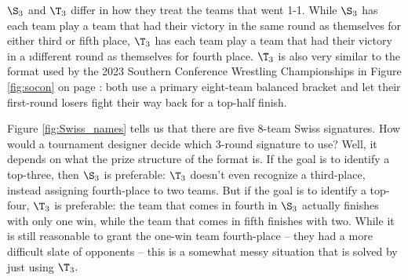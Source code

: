 {    $\S_3$ and $\T_3$ differ in how they treat the teams that went 1-1. While $\S_3$ has each team play a team that had their victory in the same round as themselves for either third or fifth place, $\T_3$ has each team play a team that had their victory in a \i{different} round as themselves for fourth place.
    $\T_3$ is also very similar to the format used by the 2023 Southern Conference Wrestling Championships in Figure \ref{fig:socon} on page \pageref{fig:socon}: both use a primary eight-team balanced bracket and let their first-round losers fight their way back for a top-half finish.


    Figure \ref{fig:Swiss_names} tells us that there are five $8$-team Swiss signatures. How would a tournament designer decide which 3-round signature to use? Well, it depends on what the prize structure of the format is. If the goal is to identify a top-three, then  $\S_3$ is preferable: $\T_3$ doesn't even recognize a third-place, instead assigning fourth-place to two teams. But if the goal is to identify a top-four, $\T_3$ is preferable: the team that comes in fourth in $\S_3$ actually finishes with only one win, while the team that comes in fifth finishes with two. While it is still reasonable to grant the one-win team fourth-place -- they had a more difficult slate of opponents -- this is a somewhat messy situation that is solved by just using $\T_3.$

}
